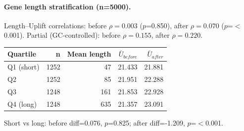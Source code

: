 \paragraph{Gene length stratification (n=5000).}
Length--Uplift correlations: before $\rho=0.003$ ($p$=0.850), after $\rho=0.070$ ($p$=$<$0.001).
Partial (GC-controlled): before $\rho=0.155$, after $\rho=0.220$.
\begin{center}\small
\begin{tabular}{lrrrr}\toprule
Quartile & n & Mean length & $\bar U_{before}$ & $\bar U_{after}$ \\\midrule
Q1 (short) & 1252 & 47 & 21.433 & 21.881 \\
Q2 & 1252 & 85 & 21.951 & 22.288 \\
Q3 & 1248 & 161 & 21.853 & 22.928 \\
Q4 (long) & 1248 & 635 & 21.357 & 23.091 \\
\bottomrule\end{tabular}\end{center}
Short vs long: before diff=0.076, $p$=0.825; after diff=-1.209, $p$=$<$0.001.
